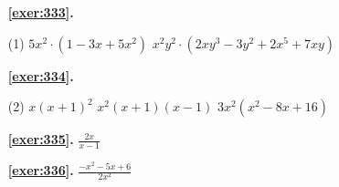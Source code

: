 \begin{enumerate}

 \item[\fontfamily{phv}\selectfont\color{blue}\textbf{\ref{exer:333}. }] \label{ans:333}
 \begin{tasks}[column-sep=1em, item-indent=1.3333em](1)
	 \task $5x^2 \cdot (1-3x+5x^2)$
	 \task* $x^2 y^2 \cdot (2 xy^3 - 3y^2 + 2 x^5 + 7xy)$
\end{tasks}



 \item[\fontfamily{phv}\selectfont\color{blue}\textbf{\ref{exer:334}. }] \label{ans:334}
 \begin{tasks}[column-sep=1em, item-indent=1.3333em](2)
	 \task $x (x+1)^2$
	 \task $x^2 (x+1)(x-1)$
	 \task $3x^2 (x^2-8x+16)$
\end{tasks}
\item[\fontfamily{phv}\selectfont\color{blue}\textbf{\ref{exer:335}. }] \label{ans:335} 
$\frac {2x}{x-1}$
\item[\fontfamily{phv}\selectfont\color{blue}\textbf{\ref{exer:336}. }] \label{ans:336} 
$\frac {-x^2-5x+6}{2x^2}$
 \end{enumerate}

 \vspace{1cm} 
 

\vspace{0.3cm}


